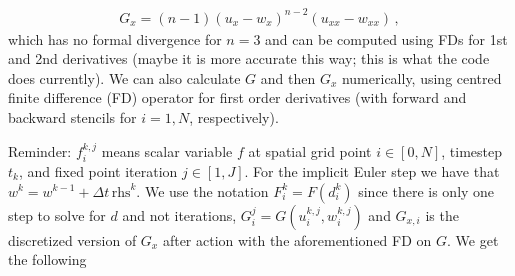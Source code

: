 \documentclass[11pt,a4paper]{article}
\begin{document}
\begin{align*}
    G_x = (n-1)(u_x-w_x)^{n-2} (u_{xx}-w_{xx})
    \,, 
\end{align*}
which has no formal divergence for $n=3$ and can be computed using FDs for 1st and 2nd derivatives (maybe it is more accurate this way; this is what the code does currently). We can also calculate $G$ and then $G_x$ numerically, using centred finite difference (FD) operator for first order derivatives (with forward and backward stencils for $i=1,N$, respectively).

Reminder: $f^{k,j}_i$ means scalar variable $f$ at spatial grid point $i \in[0,N]$, timestep $t_k$, and fixed point iteration $j \in [1,J]$. For the implicit Euler step we have that $w^k = w^{k-1} + \Delta t \, \text{rhs}^k$. We use the notation $F^k_i = F(d^k_i)$ since there is only one step to solve for $d$ and not iterations, $G^j_i=G(u^{k,j}_i,w^{k,j}_i)$ and $G_{x,i}$ is the discretized version of $G_x$ after action with the aforementioned FD on $G$. We get the following
\end{document}

